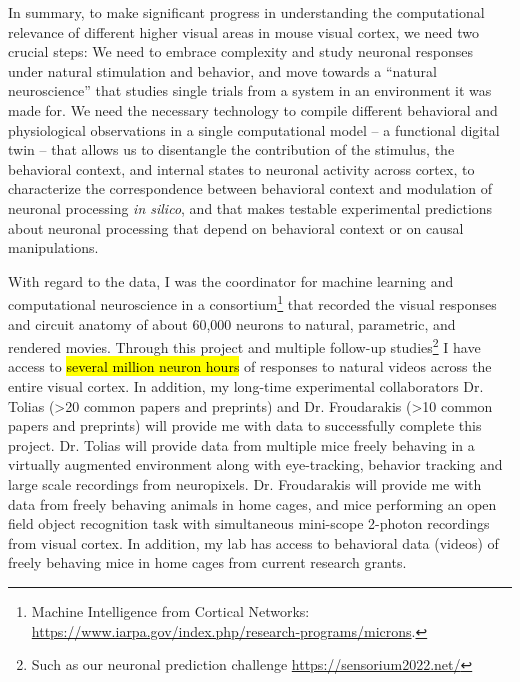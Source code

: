 \documentclass[COG,11pt]{ercgrant}
\begin{document}
In summary, to make significant progress in understanding the computational relevance of different higher visual areas in mouse visual cortex, we need two crucial steps:  We need to embrace complexity and study neuronal responses under natural stimulation and behavior, and move towards a ``natural neuroscience'' that studies single trials from a system in an environment it was made for.  We need the necessary technology to compile different behavioral and physiological observations in a single computational model -- a functional digital twin -- that allows us to disentangle the contribution of the stimulus, the behavioral context, and internal states to neuronal activity across cortex, to characterize the correspondence between behavioral context and modulation of neuronal processing \textit{in silico}, and that makes testable experimental predictions about neuronal processing that depend on behavioral context or on causal manipulations. 

With regard to the data, I was the coordinator for machine learning and computational neuroscience in a consortium\footnote{Machine Intelligence from Cortical Networks: \url{https://www.iarpa.gov/index.php/research-programs/microns}.} that recorded the visual responses and circuit anatomy of about 60,000 neurons to natural, parametric, and rendered movies. Through this project and multiple follow-up studies\footnote{Such as our neuronal prediction challenge \url{https://sensorium2022.net/}} I have access to \hl{several million neuron hours} of responses to natural videos across the entire visual cortex. In addition, my long-time experimental collaborators Dr. Tolias (>20 common papers and preprints) and Dr. Froudarakis (>10 common papers and preprints) will provide me with data to successfully complete this project. Dr. Tolias will provide data from multiple mice freely behaving in a virtually augmented environment along with eye-tracking, behavior tracking and large scale recordings from neuropixels. Dr. Froudarakis will provide me with data from freely behaving animals in home cages, and mice performing an open field object recognition task with simultaneous mini-scope 2-photon recordings from visual cortex. 
In addition, my lab has access to behavioral data (videos) of freely behaving mice in home cages from current research grants. 
\end{document}
